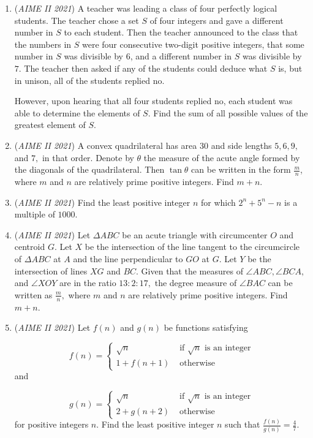 \begin{enumerate}
 

	\item (\textit{AIME II 2021}) A teacher was leading a class of four perfectly logical students. The teacher chose a set $S$ of four integers and gave a different number in $S$ to each student. Then the teacher announced to the class that the numbers in $S$ were four consecutive two-digit positive integers, that some number in $S$ was divisible by $6$, and a different number in $S$ was divisible by $7$. The teacher then asked if any of the students could deduce what $S$ is, but in unison, all of the students replied no.


 However, upon hearing that all four students replied no, each student was able to determine the elements of $S$. Find the sum of all possible values of the greatest element of $S$.


 

	\item (\textit{AIME II 2021}) A convex quadrilateral has area $30$ and side lengths $5, 6, 9,$ and $7,$ in that order. Denote by $\theta$ the measure of the acute angle formed by the diagonals of the quadrilateral. Then $\tan \theta$ can be written in the form $\frac{m}{n}$, where $m$ and $n$ are relatively prime positive integers. Find $m + n$.


 

	\item (\textit{AIME II 2021}) Find the least positive integer $n$ for which $2^n + 5^n - n$ is a multiple of $1000$.


 

	\item (\textit{AIME II 2021}) Let $\Delta ABC$ be an acute triangle with circumcenter $O$ and centroid $G$. Let $X$ be the intersection of the line tangent to the circumcircle of $\Delta ABC$ at $A$ and the line perpendicular to $GO$ at $G$. Let $Y$ be the intersection of lines $XG$ and $BC$. Given that the measures of $\angle ABC, \angle BCA,$ and $\angle XOY$ are in the ratio $13 : 2 : 17,$ the degree measure of $\angle BAC$ can be written as $\frac{m}{n},$ where $m$ and $n$ are relatively prime positive integers. Find $m+n$.


 

	\item (\textit{AIME II 2021}) Let $f(n)$ and $g(n)$ be functions satisfying

 \[f(n) =  \begin{cases} \sqrt{n} & \text{ if } \sqrt{n} \text{ is an integer}\\ 1 + f(n+1) & \text{ otherwise} \end{cases}\]
and

 \[g(n) = \begin{cases}\sqrt{n} & \text{ if } \sqrt{n} \text{ is an integer}\\ 2 + g(n+2) & \text{ otherwise} \end{cases}\]
for positive integers $n$. Find the least positive integer $n$ such that $\frac{f(n)}{g(n)} = \frac{4}{7}$.


 

\end{enumerate}